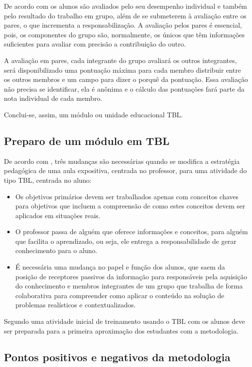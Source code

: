 De acordo com \cite{bollela} os alunos são avaliados pelo seu desempenho individual e também pelo resultado do trabalho em grupo, além de se submeterem à avaliação entre os pares, o que incrementa a responsabilização. A avaliação pelos pares é essencial, pois, os componentes do grupo são, normalmente, os únicos que têm informações suficientes para avaliar com precisão a contribuição do outro.

A avaliação em pares, cada integrante do grupo avaliará os outros integrantes, será disponibilizado uma pontuação máxima para cada membro distribuir entre os outros membros e um campo para dizer o porquê da pontuação. Essa avaliação não precisa se identificar, ela é anônima e o cálculo das pontuações fará parte da nota individual de cada membro.

Conclui-se, assim, um módulo ou unidade educacional TBL.

\subsection{Preparo de um módulo em TBL}

De acordo com \cite{bollela}, três mudanças são necessárias quando se modifica a estratégia pedagógica de uma aula expositiva, centrada no professor, para uma atividade do tipo TBL, centrada no aluno:

\begin{itemize}
  \item Os objetivos primários devem ser trabalhados apenas com conceitos chaves para objetivos que incluem a compreensão de como estes conceitos devem ser aplicados em situações reais.
  \item O professor passa de alguém que oferece informações e conceitos, para alguém que facilita o aprendizado, ou seja, ele entrega a responsabilidade de gerar conhecimento para o aluno.
  \item É necessária uma mudança no papel e função dos alunos, que saem da posição de receptores passivos da informação para responsáveis pela aquisição do conhecimento e membros integrantes de um grupo que trabalha de forma colaborativa para compreender como aplicar o conteúdo na solução de problemas realísticos e contextualizados.
\end{itemize}

Segundo \cite{bollela} uma atividade inicial de treinamento usando o TBL com os alunos deve ser preparada para a primeira aproximação dos estudantes com a metodologia.

\subsection{Pontos positivos e negativos da metodologia}

